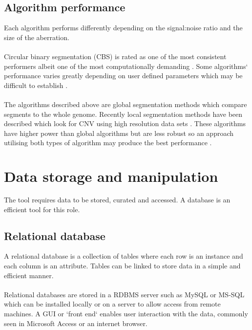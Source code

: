 \subsection{Algorithm performance}
Each algorithm performs differently depending on the signal:noise ratio and the size of the aberration\cite{willenbrock2005}.
\paragraph*{}
Circular binary segmentation (CBS) is rated as one of the most consistent performers albeit one of the most computationally demanding \cite{lai2005,willenbrock2005}. Some algorithms` performance varies greatly depending on user defined parameters which may be difficult to establish \cite{lai2005}.
\paragraph*{}
The algorithms described above are global segmentation methods which compare segments to the whole genome. Recently local segmentation methods have been described which look for CNV using high resolution data sets \cite{niu_screening_2012}. These algorithms have higher power than global algorithms but are less robust so an approach utilising both types of algorithm may produce the best performance \cite{roy2013}.

\section{Data storage and manipulation}
The tool requires data to be stored, curated and accessed. A database is an efficient tool for this role. 

\subsection{Relational database}
A relational database is a collection of tables where each row is an instance and each column is an attribute. Tables can be linked to store data in a simple and efficient manner.
\paragraph*{}
Relational databases are stored in a \ac{RDBMS} server such as MySQL or MS-SQL which can be installed locally or on a server to allow access from remote machines. A \ac{GUI} or `front end` enables user interaction with the data, commonly seen in Microsoft Access or an internet browser. 
